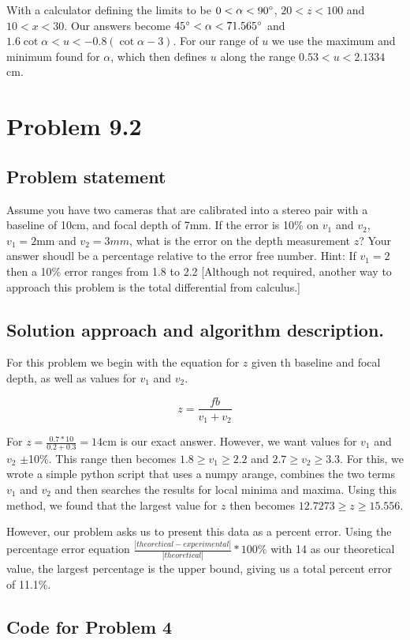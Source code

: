 \documentclass[letterpaper,11pt]{texMemo} %
\begin{document}
With a calculator defining the limits to be $0<\alpha<90\degree$, $20 < z < 100$ and $10<x<30$. Our answers become 
$45\degree<\alpha<71.565\degree$ and $1.6\cot \alpha < u < -0.8(\cot \alpha - 3)$. For our range of $u$ we use the
maximum and minimum found for $\alpha$, which then defines $u$ along the range $0.53<u<2.1334$ cm.

\newpage
\section*{Problem 9.2}
\subsection*{Problem statement}
Assume you have two cameras that are calibrated into a stereo pair with a baseline of 10cm, and focal depth of 7mm. If the error is 10\% 
on $v_1$ and $v_2$, $v_1=2$mm and $v_2=3mm$, what is the error on the depth measurement $z$? Your answer shoudl be a percentage relative 
to the error free number. Hint: If $v_1=2$ then a 10\% error ranges from 1.8 to 2.2 [Although not required, another way to approach this problem is the total differential from calculus.]

\subsection*{Solution approach and algorithm description.}

For this problem we begin with the equation for $z$ given th baseline and focal depth, as well as values for $v_1$ and $v_2$.

\[
    z = \frac{fb}{v_1+v_2}
\]

For $z = \frac{0.7*10}{0.2+0.3} = 14$cm is our exact answer. However, we want values for $v_1$ and $v_2$  $\pm$10\%. This range then 
becomes $1.8\geq v_1 \geq 2.2$ and $2.7 \geq v_2 \geq 3.3$. For this, we wrote a simple python script 
that uses a numpy arange, combines the two terms $v_1$ and $v_2$ and then searches the results for local 
minima and maxima. Using this method, we found that the largest value for $z$ then becomes $12.7273 \geq z \geq 15.556$.

However, our problem asks us to present this data as a percent error. Using the percentage error equation
$\frac{|theoretical - experimental|}{|theoretical|} * 100\%$ with 14 as our theoretical value, the largest 
percentage is the upper bound, giving us a total percent error of 11.1\%.

\newpage
\subsection*{Code for Problem 4}
\begin{tiny}

\end{tiny}
\end{document}
